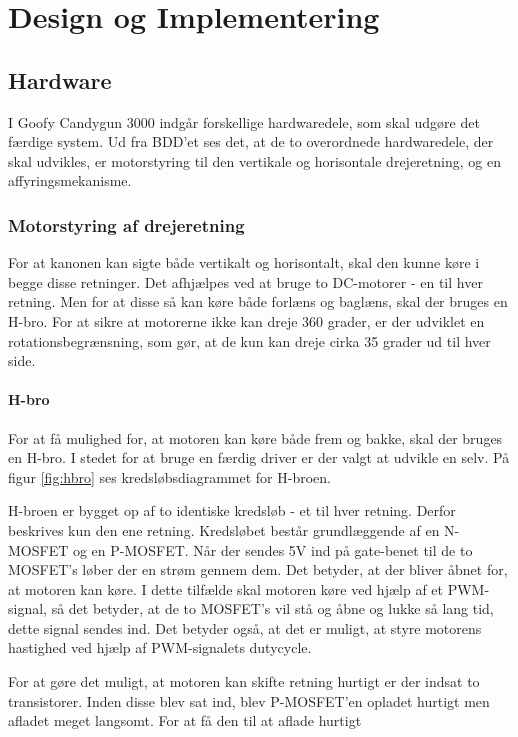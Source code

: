 \chapter{Design og Implementering}

\section{Hardware}
I Goofy Candygun 3000 indgår forskellige hardwaredele, som skal udgøre det færdige system. Ud fra BDD'et ses det, at de to overordnede hardwaredele, der skal udvikles, er motorstyring til den vertikale og horisontale drejeretning, og en affyringsmekanisme. 

\subsection{Motorstyring af drejeretning}
For at kanonen kan sigte både vertikalt og horisontalt, skal den kunne køre i begge disse retninger. Det afhjælpes ved at bruge to DC-motorer - en til hver retning. Men for at disse så kan køre både forlæns og baglæns, skal der bruges en H-bro. For at sikre at motorerne ikke kan dreje 360 grader, er der udviklet en rotationsbegrænsning, som gør, at de kun kan dreje cirka 35 grader ud til hver side. 

\subsubsection{H-bro}
For at få mulighed for, at motoren kan køre både frem og bakke, skal der bruges en H-bro. I stedet for at bruge en færdig driver er der valgt at udvikle en selv. På figur \ref{fig:hbro} ses kredsløbsdiagrammet for H-broen. 

H-broen er bygget op af to identiske kredsløb - et til hver retning. Derfor beskrives kun den ene retning. Kredsløbet består grundlæggende af en N-MOSFET og en P-MOSFET. Når der sendes 5V ind på gate-benet til de to MOSFET's løber der en strøm gennem dem. Det betyder, at der bliver åbnet for, at motoren kan køre. I dette tilfælde skal motoren køre ved hjælp af et PWM-signal, så det betyder, at de to MOSFET's vil stå og åbne og lukke så lang tid, dette signal sendes ind. Det betyder også, at det er muligt, at styre motorens hastighed ved hjælp af PWM-signalets dutycycle. 

For at gøre det muligt, at motoren kan skifte retning hurtigt er der indsat to transistorer. Inden disse blev sat ind, blev P-MOSFET'en opladet hurtigt men afladet meget langsomt. For at få den til at aflade hurtigt

